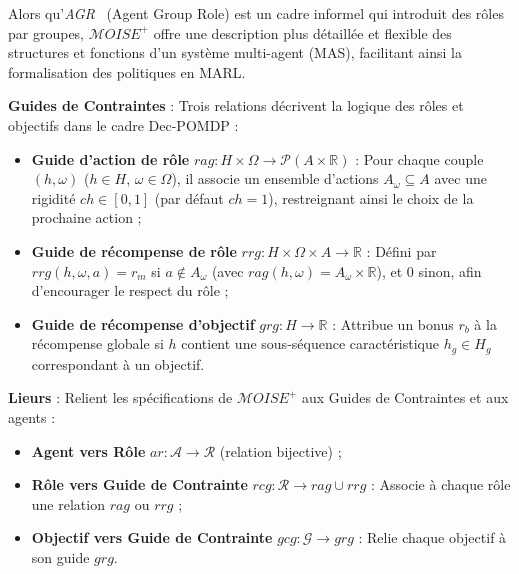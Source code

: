 \documentclass[francais,ROIA,Unicode,manuscript]{cedram}
\begin{document}
Alors qu'\textit{AGR}~\cite{ferber2003} (Agent Group Role) est un cadre informel qui introduit des rôles par groupes, \(\mathcal{M}OISE^+\) offre une description plus détaillée et flexible des structures et fonctions d'un système multi-agent (MAS), facilitant ainsi la formalisation des politiques en MARL.

\medskip
\noindent \textbf{Guides de Contraintes} : Trois relations décrivent la logique des rôles et objectifs dans le cadre Dec-POMDP :

\begin{itemize}
    \item \textbf{Guide d'action de rôle} \(rag: H \times \Omega \to \mathcal{P}(A \times \mathbb{R})\) : Pour chaque couple \((h,\omega)\) (\(h\in H\), \(\omega\in \Omega\)), il associe un ensemble d'actions \(A_\omega \subseteq A\) avec une rigidité \(ch \in [0,1]\) (par défaut \(ch=1\)), restreignant ainsi le choix de la prochaine action ;
    \item \textbf{Guide de récompense de rôle} \(rrg: H \times \Omega \times A \to \mathbb{R}\) : Défini par \(rrg(h,\omega,a)=r_m\) si \(a \notin A_\omega\) (avec \(rag(h,\omega)=A_\omega \times \mathbb{R}\)), et 0 sinon, afin d'encourager le respect du rôle ;
    \item \textbf{Guide de récompense d'objectif} \(grg: H \to \mathbb{R}\) : Attribue un bonus \(r_b\) à la récompense globale si \(h\) contient une sous-séquence caractéristique \(h_g \in H_g\) correspondant à un objectif.
\end{itemize}


\medskip
\noindent \textbf{Lieurs} : Relient les spécifications de \(\mathcal{M}OISE^+\) aux Guides de Contraintes et aux agents :

\begin{itemize}
    \item \textbf{Agent vers Rôle} \(ar: \mathcal{A} \to \mathcal{R}\) (relation bijective) ;
    \item \textbf{Rôle vers Guide de Contrainte} \(rcg: \mathcal{R} \to rag \cup rrg\) : Associe à chaque rôle une relation \(rag\) ou \(rrg\) ;
    \item \textbf{Objectif vers Guide de Contrainte} \(gcg: \mathcal{G} \to grg\) : Relie chaque objectif à son guide \(grg\).
\end{itemize}
\end{document}
